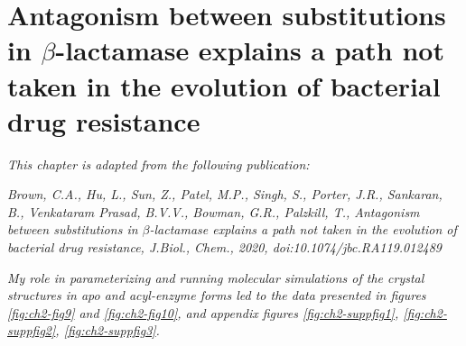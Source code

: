 \documentclass[../main.tex]{subfiles}
\begin{document}
\chapter{Antagonism between substitutions in $\beta$-lactamase explains a path not taken in the evolution of bacterial drug resistance}
    \graphicspath{{Chapter2/}}
    \label{ch:chapter2}
    \captionsetup{labelfont=bf}

\textit{This chapter is adapted from the following publication:}

\textit{Brown, C.A., Hu, L., Sun, Z., Patel, M.P., Singh, S., Porter, J.R., Sankaran, B., Venkataram Prasad, B.V.V., Bowman, G.R., Palzkill, T., Antagonism between substitutions in $\beta$-lactamase explains a path not taken in the evolution of bacterial drug resistance, J.Biol., Chem., 2020, doi:10.1074/jbc.RA119.012489}\cite{brown_antagonism_2020}

\textit{My role in parameterizing and running molecular simulations of the crystal structures in apo and acyl-enzyme forms led to the data presented in figures \ref{fig:ch2-fig9} and \ref{fig:ch2-fig10}, and appendix figures \ref{fig:ch2-suppfig1}, \ref{fig:ch2-suppfig2}, \ref{fig:ch2-suppfig3}.}

\end{document}
